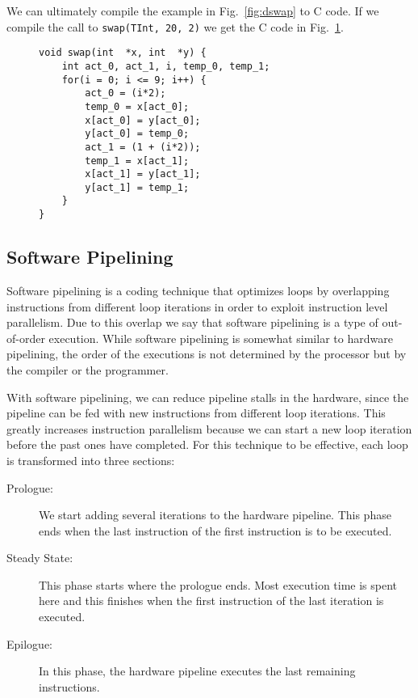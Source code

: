 \documentclass[10pt]{article}
\begin{document}
We can ultimately compile the example in Fig.~\ref{fig:dswap} to C code. If we compile the call to \texttt{swap(TInt, 20, 2)}
we get the C code in Fig.~\ref{fig:dswap_compiled}.

\lstset{basicstyle=\small,language=C}

\begin{figure}[ht]
\begin{lstlisting}
void swap(int  *x, int  *y) {
    int act_0, act_1, i, temp_0, temp_1;
    for(i = 0; i <= 9; i++) {
        act_0 = (i*2);
        temp_0 = x[act_0];
        x[act_0] = y[act_0];
        y[act_0] = temp_0;
        act_1 = (1 + (i*2));
        temp_1 = x[act_1];
        x[act_1] = y[act_1];
        y[act_1] = temp_1;
    }
}
\end{lstlisting}
\label{fig:dswap_compiled}
\end{figure}

\subsection{Software Pipelining}

Software pipelining is a coding technique that optimizes loops by overlapping instructions
from different loop iterations in order to exploit instruction level parallelism.
Due to this overlap we say that software pipelining is a type of out-of-order execution.
While software pipelining is somewhat similar to hardware pipelining, the order of the executions
is not determined by the processor but by the compiler or the programmer.

With software pipelining, we can reduce
pipeline stalls in the hardware, since the pipeline can be fed with new instructions from
different loop iterations. This greatly increases instruction parallelism because we can
start a new loop iteration before the past ones have completed. For this technique to be
effective, each loop is transformed into three sections:

\begin{description}
   \item[Prologue:] We start adding several iterations to the hardware pipeline.
   This phase ends when the last instruction of the first instruction is to be executed.
   
   \item[Steady State:] This phase starts where the prologue ends. Most execution time is spent
   here and this finishes when the first instruction of the last iteration is executed.
   
   \item[Epilogue:] In this phase, the hardware pipeline executes the last remaining instructions.
\end{description}
\end{document}
